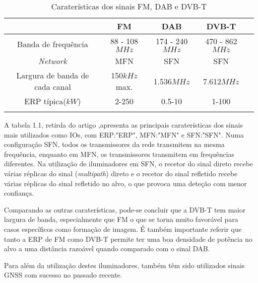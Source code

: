\begin{table}[h]
\centering
\begin{tabular}{@{}ccccc@{}}
\toprule
                    	 & FM                & DAB     & DVB-T     \\ \midrule
Banda de frequência      & 88 - 108$MHz$   & 174 - 240$MHz$  & 470 - 862$MHz$           \\
\textit{Network}    			 & MFN   & SFN   & SFN \\
Largura de banda de cada canal    & 150$kHz$ max.      & 1.536$MHz$  & 7.612$MHz$   \\ 
ERP típica($kW$)      & 2-250         & 0.5-10    & 1-100            \\ \bottomrule
\label{tab:cara}
\end{tabular}
\caption[Caraterísticas dos sinais FM, DAB e DVB-T]{Caraterísticas dos sinais FM, DAB e DVB-T \parencite{HeinerKuschel2019}}
\end{table} 
\par
A tabela 1.1, retirda do artigo \cite{HeinerKuschel2019},apresenta as principais caraterísticas dos sinais mais utilizados como \gls{IO}s, com ERP:"\gls{ERP}", MFN:"\gls{MFN}" e SFN:"\gls{SFN}". Numa configuração \gls{SFN}, todos os transmissores da rede transmitem na mesma frequência, enquanto em \gls{MFN}, os transmissores transmitem em frequências diferentes. Na utilização de iluminadores em \gls{SFN}, o recetor do sinal direto recebe várias réplicas do sinal (\textit{multipath}) direto e o recetor do sinal refletido recebe várias réplicas do sinal refletido no alvo, o que provoca uma deteção com menor confiança.\par 
Comparando as outras caraterísticas, pode-se concluir que a \gls{DVB-T} tem maior largura de banda, especialmente que \gls{FM} o que se torna muito favorável para casos específicos como formação de imagem. É também importante referir que tanto a \gls{ERP} de \gls{FM} como \gls{DVB-T} permite ter uma boa densidade de potência no alvo a uma distância razoável quando comparado com o sinal \gls{DAB}.\par 
Para além da utilização destes iluminadores, também têm sido utilizados sinais \gls{GNSS} com sucesso no passado recente.

